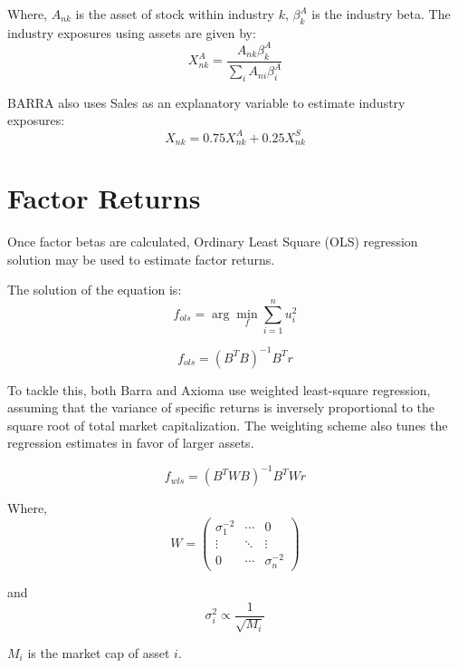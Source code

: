\documentclass{article}
\begin{document}
Where, \( A_{nk} \) is the asset of stock within industry \( k \), \( \beta^A_k \) is the industry beta. The industry exposures using assets are given by:
\begin{equation}
X^A_{nk} = \frac{A_{nk} \beta^A_k}{\sum_i A_{ni} \beta^A_i}
\end{equation}

BARRA also uses Sales as an explanatory variable to estimate industry exposures:
\begin{equation}
X_{nk} = 0.75 X^A_{nk} + 0.25 X^S_{nk}
\end{equation}

\section*{Factor Returns}
Once factor betas are calculated, Ordinary Least Square (OLS) regression solution may be used to estimate factor returns.

The solution of the equation is:
\begin{equation}
f_{ols} = \arg\min_{f} \sum_{i=1}^{n} u_i^2
\end{equation}

\begin{equation}
f_{ols} = (B^T B)^{-1} B^T r
\end{equation}

To tackle this, both Barra and Axioma use weighted least-square regression, assuming that the variance of specific returns is inversely proportional to the square root of total market capitalization. The weighting scheme also tunes the regression estimates in favor of larger assets.

\begin{equation}
f_{wls} = (B^T W B)^{-1} B^T W r
\end{equation}

Where, 
\begin{equation}
W = \begin{pmatrix}
\sigma_1^{-2} & \cdots & 0 \\
\vdots & \ddots & \vdots \\
0 & \cdots & \sigma_n^{-2}
\end{pmatrix}
\end{equation}

and 
\begin{equation}
\sigma_i^2 \propto \frac{1}{\sqrt{M_i}}
\end{equation}

\( M_i \) is the market cap of asset \( i \).
\end{document}
